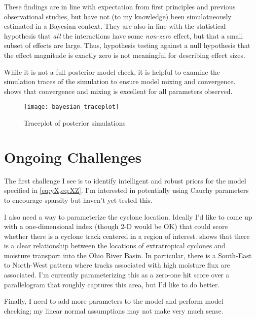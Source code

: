 \documentclass[12pt]{article}
\begin{document}
These findings are in line with expectation from first principles and previous observational studies, but have not (to my knowledge) been simulatneously estimated in a Bayesian context.
They are also in line with the statistical hypothesis that \emph{all} the interactions have some \emph{non-zero} effect, but that a small subset of effects are large.
Thus, hypothesis testing against a null hypothesis that the effect magnitude is exactly zero is not meaningful for describing effect sizes.

While it is not a full posterior model check, it is helpful to examine the simulation traces of the simulation to ensure model mixing and convergence.
 shows that convergence and mixing is excellent for all parameters observed.
\begin{figure}
    \centering
    \texttt{[image: bayesian\_traceplot]}
    \caption{Traceplot of posterior simulations}
    \label{label:stan-trace}
\end{figure}


\section{Ongoing Challenges} \label{sec:challenges}

The first challenge I see is to identify intelligent and robust priors for the model specified in \cref{eq:yX,eq:XZ}.
I'm interested in potentially using Cauchy parameters to encourage sparsity but haven't yet tested this.

I also need a way to parameterize the cyclone location.
Ideally I'd like to come up with a one-dimensional index (though 2-D would be OK) that could score whether there is a cyclone track centered in a region of interest.
 shows that there is a clear relationship between the locations of extratropical cyclones and moisture transport into the Ohio River Basin.
In particular, there is a South-East to North-West pattern where tracks associated with high moisture flux are associated.
I'm currently parameterizing this as a zero-one hit score over a parallelogram that roughly captures this area, but I'd like to do better.

Finally, I need to add more parameters to the model and perform model checking; my linear normal assumptions may not make very much sense.




\clearpage

\end{document}
